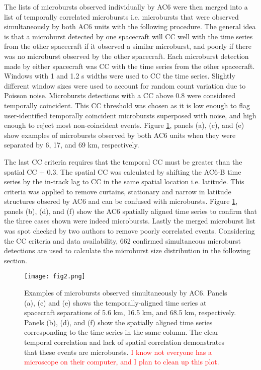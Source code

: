 \documentclass[draft]{agujournal2019}
\begin{document}
The lists of microbursts observed individually by AC6 were then merged into a list of temporally correlated microbursts i.e. microbursts that were observed simultaneously by both AC6 units with the following procedure. The general idea is that a microburst detected by one spacecraft will CC well with the time series from the other spacecraft if it observed a similar microburst, and poorly if there was no microburst observed by the other spacecraft. Each microburst detection made by either spacecraft was CC with the time series from the other spacecraft. Windows with 1 and 1.2 s widths were used to CC the time series. Slightly different window sizes were used to account for random count variation due to Poisson noise. Microbursts detections with a CC above 0.8 were considered temporally coincident. This CC threshold was chosen as it is low enough to flag user-identified temporally coincident microbursts superposed with noise, and high enough to reject most non-coincident events. Figure \ref{fig2}, panels (a), (c), and (e) show examples of microbursts observed by both AC6 units when they were separated by 6, 17, and 69 km, respectively. 

The last CC criteria requires that the temporal CC must be greater than the spatial CC + 0.3. The spatial CC was calculated by shifting the AC6-B time series by the in-track lag to CC in the same spatial location i.e. latitude. This criteria was applied to remove curtains, stationary and narrow in latitude structures obsered by AC6 \cite{Blake2016} and can be confused with microbursts. Figure \ref{fig2}, panels (b), (d), and (f) show the AC6 spatially aligned time series to confirm that the three cases shown were indeed microbursts. Lastly the merged microburst list was spot checked by two authors to remove poorly correlated events. Considering the CC criteria and data availability, 662 confirmed simultaneous microburst detections are used to calculate the microburst size distribution in the following section.

\begin{figure}
\texttt{[image: fig2.png]}
\caption{Examples of microbursts observed simultaneously by AC6. Panels (a), (c) and (e) shows the temporally-aligned time series at spacecraft separations of 5.6 km, 16.5 km, and 68.5 km, respectively. Panels (b), (d), and (f) show the spatially aligned time series corresponding to the time series in the same column. The clear temporal correlation and lack of spatial correlation demonstrates that these events are microbursts. \textcolor{red}{I know not everyone has a microscope on their computer, and I plan to clean up this plot.}} 
\label{fig2}
\end{figure}
	
\end{document}
